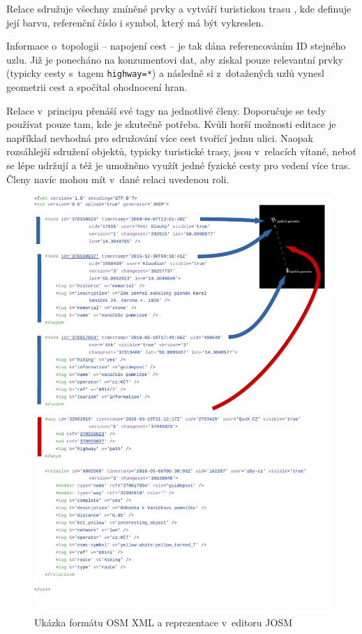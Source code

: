 Relace sdružuje všechny zmíněné prvky a vytváří turistickou trasu , kde definuje její barvu, referenční číslo i symbol, který má být vykreslen.

Informace o~topologii -- napojení cest -- je tak dána referencováním ID stejného uzlu. Již je ponecháno na konzumentovi dat, aby získal pouze relevantní prvky (typicky cesty s~tagem \texttt{highway=*}) a následně si z~dotažených uzlů vynesl geometrii cest a spočítal ohodnocení hran.

Relace v~principu přenáší své tagy na jednotlivé členy. Doporučuje se tedy používat pouze tam, kde je skutečně potřeba. Kvůli horší možnosti editace je například nevhodná pro sdružování více cest tvořící jednu ulici. Naopak rozsáhlejší sdružení objektů, typicky turistické trasy, jsou v~relacích vítané, neboť se lépe udržují a též je umožněno využít jedné fyzické cesty pro vedení více tras. Členy navíc mohou mít v~dané relaci uvedenou roli.

 \begin{figure}
	  \centering
      \includegraphics[width=\textwidth]{img/22-osm-xml-ex.pdf}
      \caption{Ukázka formátu OSM XML a reprezentace v~editoru JOSM\cite{zdroj41}}
      \label{obr22}
  \end{figure}

